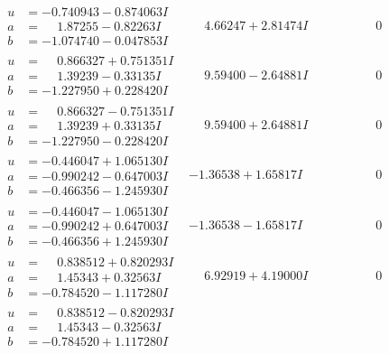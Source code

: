 \documentclass[1p]{elsarticle_modified}
\theoremstyle{definition}
\begin{document}
$$\begin{array}{c|c|c}
\begin{aligned}
u &= -0.740943 - 0.874063 I \\
a &= \phantom{-}1.87255 - 0.82263 I \\
b &= -1.074740 - 0.047853 I\end{aligned}
 & \phantom{-}4.66247 + 2.81474 I & \phantom{-0.000000 } 0 \\ \hline\begin{aligned}
u &= \phantom{-}0.866327 + 0.751351 I \\
a &= \phantom{-}1.39239 - 0.33135 I \\
b &= -1.227950 + 0.228420 I\end{aligned}
 & \phantom{-}9.59400 - 2.64881 I & \phantom{-0.000000 } 0 \\ \hline\begin{aligned}
u &= \phantom{-}0.866327 - 0.751351 I \\
a &= \phantom{-}1.39239 + 0.33135 I \\
b &= -1.227950 - 0.228420 I\end{aligned}
 & \phantom{-}9.59400 + 2.64881 I & \phantom{-0.000000 } 0 \\ \hline\begin{aligned}
u &= -0.446047 + 1.065130 I \\
a &= -0.990242 - 0.647003 I \\
b &= -0.466356 - 1.245930 I\end{aligned}
 & -1.36538 + 1.65817 I & \phantom{-0.000000 } 0 \\ \hline\begin{aligned}
u &= -0.446047 - 1.065130 I \\
a &= -0.990242 + 0.647003 I \\
b &= -0.466356 + 1.245930 I\end{aligned}
 & -1.36538 - 1.65817 I & \phantom{-0.000000 } 0 \\ \hline\begin{aligned}
u &= \phantom{-}0.838512 + 0.820293 I \\
a &= \phantom{-}1.45343 + 0.32563 I \\
b &= -0.784520 - 1.117280 I\end{aligned}
 & \phantom{-}6.92919 + 4.19000 I & \phantom{-0.000000 } 0 \\ \hline\begin{aligned}
u &= \phantom{-}0.838512 - 0.820293 I \\
a &= \phantom{-}1.45343 - 0.32563 I \\
b &= -0.784520 + 1.117280 I\end{aligned}

\end{array}$$
\end{document}

